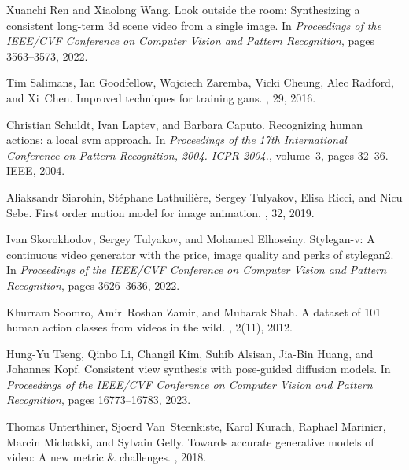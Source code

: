 \documentclass{article}
\begin{document}
\begin{thebibliography}{}
Xuanchi Ren and Xiaolong Wang.
\newblock Look outside the room: Synthesizing a consistent long-term 3d scene video from a single image.
\newblock In {\em Proceedings of the IEEE/CVF Conference on Computer Vision and Pattern Recognition}, pages 3563--3573, 2022.

Tim Salimans, Ian Goodfellow, Wojciech Zaremba, Vicki Cheung, Alec Radford, and Xi~Chen.
\newblock Improved techniques for training gans.
, 29, 2016.

Christian Schuldt, Ivan Laptev, and Barbara Caputo.
\newblock Recognizing human actions: a local svm approach.
\newblock In {\em Proceedings of the 17th International Conference on Pattern Recognition, 2004. ICPR 2004.}, volume~3, pages 32--36. IEEE, 2004.

Aliaksandr Siarohin, St{\'e}phane Lathuili{\`e}re, Sergey Tulyakov, Elisa Ricci, and Nicu Sebe.
\newblock First order motion model for image animation.
, 32, 2019.

Ivan Skorokhodov, Sergey Tulyakov, and Mohamed Elhoseiny.
\newblock Stylegan-v: A continuous video generator with the price, image quality and perks of stylegan2.
\newblock In {\em Proceedings of the IEEE/CVF Conference on Computer Vision and Pattern Recognition}, pages 3626--3636, 2022.

Khurram Soomro, Amir~Roshan Zamir, and Mubarak Shah.
\newblock A dataset of 101 human action classes from videos in the wild.
, 2(11), 2012.

Hung-Yu Tseng, Qinbo Li, Changil Kim, Suhib Alsisan, Jia-Bin Huang, and Johannes Kopf.
\newblock Consistent view synthesis with pose-guided diffusion models.
\newblock In {\em Proceedings of the IEEE/CVF Conference on Computer Vision and Pattern Recognition}, pages 16773--16783, 2023.

Thomas Unterthiner, Sjoerd Van~Steenkiste, Karol Kurach, Raphael Marinier, Marcin Michalski, and Sylvain Gelly.
\newblock Towards accurate generative models of video: A new metric \& challenges.
, 2018.


\end{thebibliography}
\end{document}
